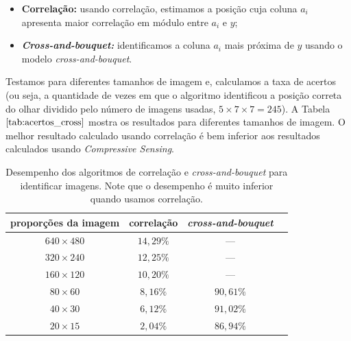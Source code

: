 \begin{itemize}
\item {\bf Correlação:} usando correlação, estimamos a posição cuja coluna $a_i$ apresenta maior correlação em módulo entre $a_i$ e $y$;

\item {\bf \textit{Cross-and-bouquet:}} identificamos a coluna $a_i$ mais próxima de $y$ usando o modelo \textit{cross-and-bouquet}.
\end{itemize}

Testamos para diferentes tamanhos de imagem e, calculamos a taxa de acertos (ou seja, a quantidade de vezes em que o algoritmo identificou a posição correta do olhar dividido pelo número de imagens usadas, $5 \times 7 \times 7 = 245$). A Tabela  $\ref{tab:acertos_cross}$ mostra os resultados para diferentes tamanhos de imagem. O melhor resultado calculado usando correlação é bem inferior aos resultados calculados usando \textit{Compressive Sensing}.

\begin{table}
\centering
\begin{tabular}{| c | c | c | c |}
\hline
{\bf proporções da imagem} & {\bf correlação} & {\bf \textit{cross-and-bouquet}}  \\ \hline
$640 \times 480$ & $14,29\%$	 & ---\\ \hline
$320 \times 240$ & $12,25\%$	 & ---\\ \hline
$160 \times 120$ & $10,20\%$	 & ---\\ \hline
$80 \times 60$   & $8,16\%$		 & $90,61\%$ \\ \hline
$40 \times 30$	 & $6,12\%$		 & $91,02\%$ \\ \hline
$20 \times 15$	 & $2,04\%$		 & $86,94\%$ \\ \hline
\end{tabular}
\caption{Desempenho dos algoritmos de correlação e \textit{cross-and-bouquet} para identificar imagens. Note que o desempenho é muito inferior quando usamos correlação.}
\label{tab:acertos_cross}
\end{table}